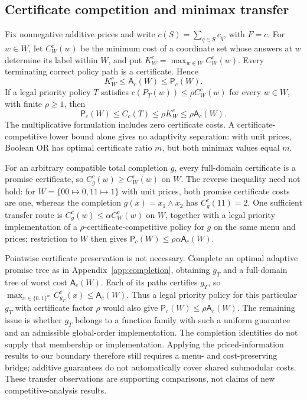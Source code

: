 \documentclass[pdflatex,sn-mathphys-num]{sn-jnl}
\newcommand{\A}{\mathsf{A}}
\newcommand{\Pcost}{\mathsf{P}}
\theoremstyle{thmstyleone}
\theoremstyle{thmstylethree}
\theoremstyle{thmstyletwo}
\begin{document}
\subsection{Certificate competition and minimax transfer}\label{sec:cert-transfer}
Fix nonnegative additive prices and write $c(S)=\sum_{q\in S}c_q$, with $F=c$. For $w\in W$, let $C_W^c(w)$ be the minimum cost of a coordinate set whose answers at $w$ determine its label within $W$, and put $K_W^c=\max_{w\in W}C_W^c(w)$. Every terminating correct policy path is a certificate. Hence
\[
 K_W^c\leq\A_c(W)\leq\Pcost_c(W).
\]
If a legal priority policy $T$ satisfies $c(P_T(w))\leq\rho C_W^c(w)$ for every $w\in W$, with finite $\rho\geq1$, then
\[
 \Pcost_c(W)\leq C_c(T)\leq\rho K_W^c\leq\rho\A_c(W).
\]
The multiplicative formulation includes zero certificate costs. A certificate-competitive lower bound alone gives no adaptivity separation: with unit prices, Boolean OR has optimal certificate ratio $m$, but both minimax values equal $m$.

For an arbitrary compatible total completion $g$, every full-domain certificate is a promise certificate, so $C_g^c(w)\geq C_W^c(w)$ on $W$. The reverse inequality need not hold: for $W=\{00\mapsto0,11\mapsto1\}$ with unit prices, both promise certificate costs are one, whereas the completion $g(x)=x_1\wedge x_2$ has $C_g^c(11)=2$. One sufficient transfer route is $C_g^c(w)\leq\alpha C_W^c(w)$ on $W$, together with a legal priority implementation of a $\rho$-certificate-competitive policy for $g$ on the same menu and prices; restriction to $W$ then gives $\Pcost_c(W)\leq\rho\alpha\A_c(W)$.

Pointwise certificate preservation is not necessary. Complete an optimal adaptive promise tree as in Appendix~\ref{app:completion}, obtaining $g_T$ and a full-domain tree of worst cost $\A_c(W)$. Each of its paths certifies $g_T$, so $\max_{x\in\{0,1\}^m}C_{g_T}^c(x)\leq\A_c(W)$. Thus a legal priority policy for this particular $g_T$ with certificate factor $\rho$ would also give $\Pcost_c(W)\leq\rho\A_c(W)$. The remaining issue is whether $g_T$ belongs to a function family with such a uniform guarantee and an admissible global-order implementation. The completion identities do not supply that membership or implementation. Applying the priced-information results to our boundary therefore still requires a menu- and cost-preserving bridge; additive guarantees do not automatically cover shared submodular costs. These transfer observations are supporting comparisons, not claims of new competitive-analysis results.
\end{document}
